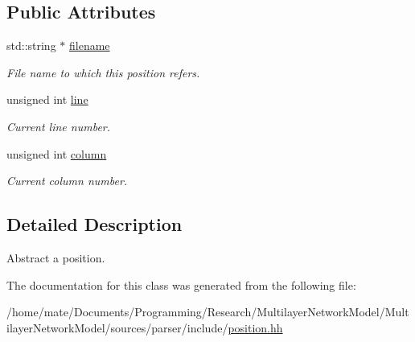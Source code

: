 \subsection*{Public Attributes}
\begin{DoxyCompactItemize}
\item 
std\+::string $\ast$ \hyperlink{classEquationParser_1_1position_ae72228d06f93d658f9e6023f1d0b89c6}{filename}\hypertarget{classEquationParser_1_1position_ae72228d06f93d658f9e6023f1d0b89c6}{}\label{classEquationParser_1_1position_ae72228d06f93d658f9e6023f1d0b89c6}

\begin{DoxyCompactList}\small\item\em File name to which this position refers. \end{DoxyCompactList}\item 
unsigned int \hyperlink{classEquationParser_1_1position_a087471d9fd1ad64feeb4f5f9b7216d0a}{line}\hypertarget{classEquationParser_1_1position_a087471d9fd1ad64feeb4f5f9b7216d0a}{}\label{classEquationParser_1_1position_a087471d9fd1ad64feeb4f5f9b7216d0a}

\begin{DoxyCompactList}\small\item\em Current line number. \end{DoxyCompactList}\item 
unsigned int \hyperlink{classEquationParser_1_1position_a814bc54c59419fb7d2e82bb33b5c9aa8}{column}\hypertarget{classEquationParser_1_1position_a814bc54c59419fb7d2e82bb33b5c9aa8}{}\label{classEquationParser_1_1position_a814bc54c59419fb7d2e82bb33b5c9aa8}

\begin{DoxyCompactList}\small\item\em Current column number. \end{DoxyCompactList}\end{DoxyCompactItemize}


\subsection{Detailed Description}
Abstract a position. 

The documentation for this class was generated from the following file\+:\begin{DoxyCompactItemize}
\item 
/home/mate/\+Documents/\+Programming/\+Research/\+Multilayer\+Network\+Model/\+Multilayer\+Network\+Model/sources/parser/include/\hyperlink{position_8hh}{position.\+hh}\end{DoxyCompactItemize}
